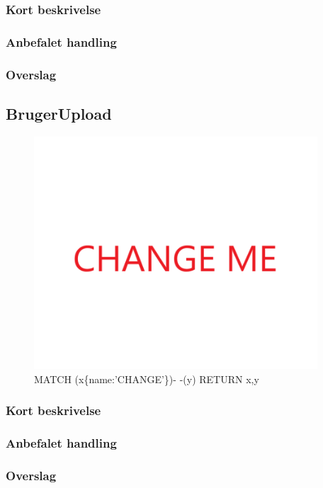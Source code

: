 \documentclass{article}
\begin{document}
\subsubsection{Kort beskrivelse}
\subsubsection{Anbefalet handling}
\subsubsection{Overslag}
\subsection{BrugerUpload}
\begin{figure}[h]
\includegraphics[width=300pt]{CHANGE.PNG}
\caption{MATCH (x\{name:'CHANGE'\})- -(y) RETURN x,y}
\end{figure}
\subsubsection{Kort beskrivelse}
\subsubsection{Anbefalet handling}
\subsubsection{Overslag}
\end{document}
